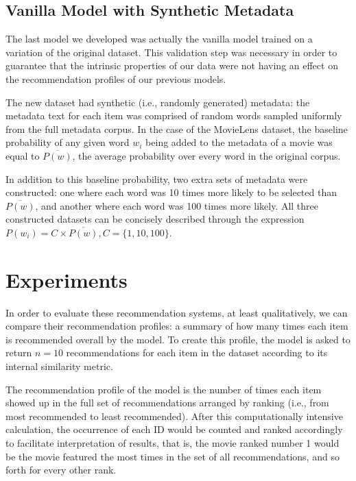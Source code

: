 \subsection{Vanilla Model with Synthetic Metadata}
\label{subsec:synthetic}

The last model we developed was actually the vanilla model trained on a
variation of the original dataset. This validation step was necessary in order
to guarantee that the intrinsic properties of our data were not having an effect
on the recommendation profiles of our previous models.

The new dataset had synthetic (i.e., randomly generated) metadata: the metadata
text for each item was comprised of random words sampled uniformly from the full
metadata corpus. In the case of the MovieLens dataset, the baseline probability
of any given word $w_i$ being added to the metadata of a movie was equal to
$\overline{P(w)}$, the average probability over every word in the original
corpus.

In addition to this baseline probability, two extra sets of metadata were
constructed: one where each word was 10 times more likely to be selected than
$\overline{P(w)}$, and another where each word was 100 times more likely. All
three constructed datasets can be concisely described through the expression
$P(w_i) = C \times \overline{P(w)}, C = \{1, 10, 100\}$.

\section{Experiments}
\label{sec:experiments}

In order to evaluate these recommendation systems, at least qualitatively, we
can compare their recommendation profiles: a summary of how many times each item
is recommended overall by the model. To create this profile, the model is asked
to return $n = 10$ recommendations for each item in the dataset according to its
internal similarity metric.

The recommendation profile of the model is the number of times each item showed
up in the full set of recommendations arranged by ranking (i.e., from most
recommended to least recommended). After this computationally intensive
calculation, the occurrence of each ID would be counted and ranked accordingly
to facilitate interpretation of results, that is, the movie ranked number 1
would be the movie featured the most times in the set of all recommendations,
and so forth for every other rank.

